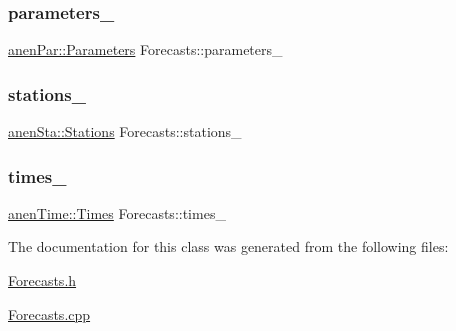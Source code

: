 \mbox{\label{class_forecasts_a514e1029a27c9d797212158238e4ec86}} 
\subsubsection{\texorpdfstring{parameters\+\_\+}{parameters\_}}
{\footnotesize\ttfamily \mbox{\hyperlink{classanen_par_1_1_parameters}{anen\+Par\+::\+Parameters}} Forecasts\+::parameters\+\_\+\hspace{0.3cm}{\ttfamily [protected]}}

\mbox{\label{class_forecasts_ac86fcc7d20b581d87a32eac26a5f8b01}} 
\subsubsection{\texorpdfstring{stations\+\_\+}{stations\_}}
{\footnotesize\ttfamily \mbox{\hyperlink{classanen_sta_1_1_stations}{anen\+Sta\+::\+Stations}} Forecasts\+::stations\+\_\+\hspace{0.3cm}{\ttfamily [protected]}}

\mbox{\label{class_forecasts_a5db6d70382b21bc6621b7765d21f6d61}} 
\subsubsection{\texorpdfstring{times\+\_\+}{times\_}}
{\footnotesize\ttfamily \mbox{\hyperlink{classanen_time_1_1_times}{anen\+Time\+::\+Times}} Forecasts\+::times\+\_\+\hspace{0.3cm}{\ttfamily [protected]}}



The documentation for this class was generated from the following files\+:\begin{DoxyCompactItemize}
\item 
\mbox{\hyperlink{_forecasts_8h}{Forecasts.\+h}}\item 
\mbox{\hyperlink{_forecasts_8cpp}{Forecasts.\+cpp}}\end{DoxyCompactItemize}
